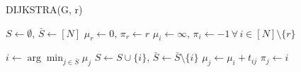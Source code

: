 \begin{algorithm}
\caption{DIJKSTRA(G, r)}
\label{alg:dijkstra}
\begin{algorithmic}[1]

\STATE $S\leftarrow \emptyset,\, \bar{S}\leftarrow [N]$
\STATE $\mu_r\leftarrow 0,\, \pi_r\leftarrow r$
\STATE $\mu_i\leftarrow \infty,\, \pi_i\leftarrow -1\, \forall\, i\in [N]\setminus \{r\}$

	\STATE $i\leftarrow \arg\min_{j\in\bar{S}} \mu_j$
	\STATE $S\leftarrow S\cup \{i\},\, \bar{S}\leftarrow \bar{S}\setminus \{i\}$
			\STATE $\mu_j\leftarrow \mu_i + t_{ij}$
			\STATE $\pi_j \leftarrow i$
		\ENDIF
	\ENDFOR
\ENDWHILE

\end{algorithmic}
\end{algorithm}
